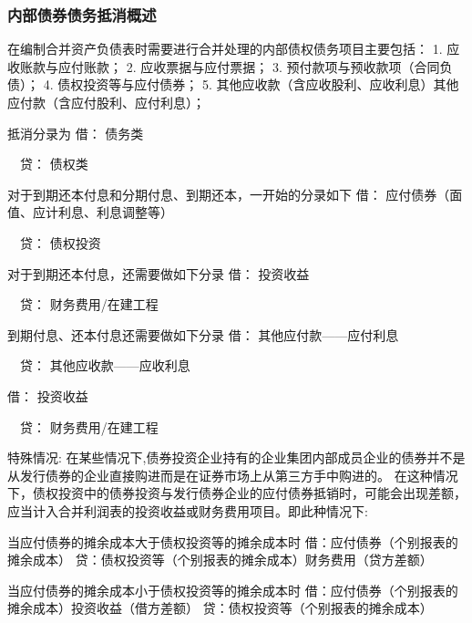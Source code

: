 \documentclass[UTF8,12pt]{ctexart}
\newenvironment{Dr}{\noindent 借：}{\par}
\newenvironment{Cr}{\noindent \ \ 贷：}{\par}
\numberwithin{equation}{section} %
\numberwithin{figure}{section}
\numberwithin{table}{section}
\begin{document}
	\subsubsection{内部债券债务抵消概述}
	在编制合并资产负债表时需要进行合并处理的内部债权债务项目主要包括：
	1.	应收账款与应付账款；
	2.	应收票据与应付票据；
	3.	预付款项与预收款项（合同负债）；
	4.	债权投资等与应付债券；
	5.	其他应收款（含应收股利、应收利息）其他应付款（含应付股利、应付利息）；
	
	抵消分录为
	\begin{Dr}
		债务类
	\end{Dr}
	\begin{Cr}
		债权类
	\end{Cr}
	
	对于到期还本付息和分期付息、到期还本，一开始的分录如下
	\begin{Dr}
		应付债券（面值、应计利息、利息调整等）
	\end{Dr}
	\begin{Cr}
		债权投资
	\end{Cr}
	
	对于到期还本付息，还需要做如下分录
	\begin{Dr}
		投资收益
	\end{Dr}
	\begin{Cr}
		财务费用/在建工程
	\end{Cr}
	
	到期付息、还本付息还需要做如下分录
	\begin{Dr}
		其他应付款——应付利息
	\end{Dr}
	\begin{Cr}
		其他应收款——应收利息
	\end{Cr}
	\begin{Dr}
		投资收益
	\end{Dr}
	\begin{Cr}
		财务费用/在建工程
	\end{Cr}
	
	特殊情况:
	在某些情况下,债券投资企业持有的企业集团内部成员企业的债券并不是从发行债券的企业直接购进而是在证券市场上从第三方手中购进的。
	在这种情况下，债权投资中的债券投资与发行债券企业的应付债券抵销时，可能会出现差额，应当计入合并利润表的投资收益或财务费用项目。即此种情况下:
	
	当应付债券的摊余成本大于债权投资等的摊余成本时
	借：应付债券（个别报表的摊余成本）
	贷：债权投资等（个别报表的摊余成本）财务费用（贷方差额）
	
	当应付债券的摊余成本小于债权投资等的摊余成本时
	借：应付债券（个别报表的摊余成本）投资收益（借方差额）
	贷：债权投资等（个别报表的摊余成本）
	
\end{document}
